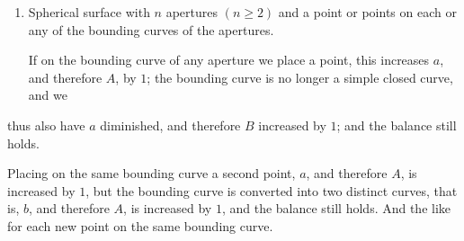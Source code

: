 \documentclass[11pt,a4paper]{article}
\theoremstyle{plain}
\theoremstyle{definition}
\begin{document}
\begin{enumerate}
where, comparing with case $5$, we see the different effects of a point and an aperture.

\item Spherical surface with $n$ apertures $(n \geq 2)$ and a point or points on each or
any of the bounding curves of the apertures.

If on the bounding curve of any aperture we place a point, this increases $a$, and
therefore $A$, by $1$; the bounding curve is no longer a simple closed curve, and we

\end{enumerate}

\clearpage

thus also have $a$ diminished, and therefore $B$ increased by $1$; and the balance still
holds.

Placing on the same bounding curve a second point, $a$, and therefore $A$, is
increased by $1$, but the bounding curve is converted into two distinct curves, that
is, $b$, and therefore $A$, is increased by $1$, and the balance still holds. And the like
for each new point on the same bounding curve.
\end{document}
